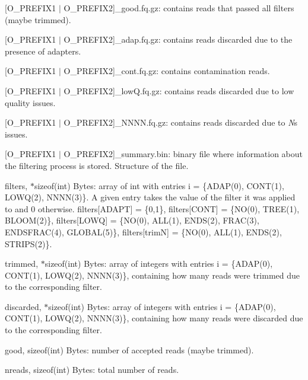 \begin{DoxyItemize}
\item {\ttfamily \mbox{[}O\+\_\+\+P\+R\+E\+F\+I\+X1 $\vert$ O\+\_\+\+P\+R\+E\+F\+I\+X2\mbox{]}\+\_\+good.\+fq.\+gz}\+: contains reads that passed all filters (maybe trimmed).
\item {\ttfamily \mbox{[}O\+\_\+\+P\+R\+E\+F\+I\+X1 $\vert$ O\+\_\+\+P\+R\+E\+F\+I\+X2\mbox{]}\+\_\+adap.\+fq.\+gz}\+: contains reads discarded due to the presence of adapters.
\item {\ttfamily \mbox{[}O\+\_\+\+P\+R\+E\+F\+I\+X1 $\vert$ O\+\_\+\+P\+R\+E\+F\+I\+X2\mbox{]}\+\_\+cont.\+fq.\+gz}\+: contains contamination reads.
\item {\ttfamily \mbox{[}O\+\_\+\+P\+R\+E\+F\+I\+X1 $\vert$ O\+\_\+\+P\+R\+E\+F\+I\+X2\mbox{]}\+\_\+low\+Q.\+fq.\+gz}\+: contains reads discarded due to low quality issues.
\item {\ttfamily \mbox{[}O\+\_\+\+P\+R\+E\+F\+I\+X1 $\vert$ O\+\_\+\+P\+R\+E\+F\+I\+X2\mbox{]}\+\_\+\+N\+N\+N\+N.\+fq.\+gz}\+: contains reads discarded due to {\itshape N}\textquotesingle{}s issues.
\item {\ttfamily \mbox{[}O\+\_\+\+P\+R\+E\+F\+I\+X1 $\vert$ O\+\_\+\+P\+R\+E\+F\+I\+X2\mbox{]}\+\_\+summary.\+bin}\+: binary file where information about the filtering process is stored. Structure of the file.
\begin{DoxyItemize}
\item filters, {$\ast$sizeof(int) Bytes}\+: array of int with entries {\ttfamily i = \{A\+D\+A\+P(0), C\+O\+N\+T(1), L\+O\+W\+Q(2), N\+N\+N\+N(3)\}}. A given entry takes the value of the filter it was applied to and 0 otherwise. {\ttfamily filters\mbox{[}A\+D\+A\+PT\mbox{]} = \{0,1\}}, {\ttfamily filters\mbox{[}C\+O\+NT\mbox{]} = \{N\+O(0), T\+R\+E\+E(1), B\+L\+O\+O\+M(2)\}}, {\ttfamily filters\mbox{[}L\+O\+WQ\mbox{]} = \{N\+O(0), A\+L\+L(1), E\+N\+D\+S(2), F\+R\+A\+C(3), E\+N\+D\+S\+F\+R\+A\+C(4), G\+L\+O\+B\+A\+L(5)\}}, {\ttfamily filters\mbox{[}trimN\mbox{]} = \{N\+O(0), A\+L\+L(1), E\+N\+D\+S(2), S\+T\+R\+I\+P\+S(2)\}}.
\item trimmed, {$\ast$sizeof(int) Bytes}\+: array of integers with entries i = \{A\+D\+A\+P(0), C\+O\+N\+T(1), L\+O\+W\+Q(2), N\+N\+N\+N(3)\}, containing how many reads were trimmed due to the corresponding filter.
\item discarded, {$\ast$sizeof(int) Bytes}\+: array of integers with entries i = \{A\+D\+A\+P(0), C\+O\+N\+T(1), L\+O\+W\+Q(2), N\+N\+N\+N(3)\}, containing how many reads were discarded due to the corresponding filter.
\item good, {\ttfamily sizeof(int) Bytes}\+: number of accepted reads (maybe trimmed).
\item nreads, {\ttfamily sizeof(int) Bytes}\+: total number of reads.
\end{DoxyItemize}
\end{DoxyItemize}

